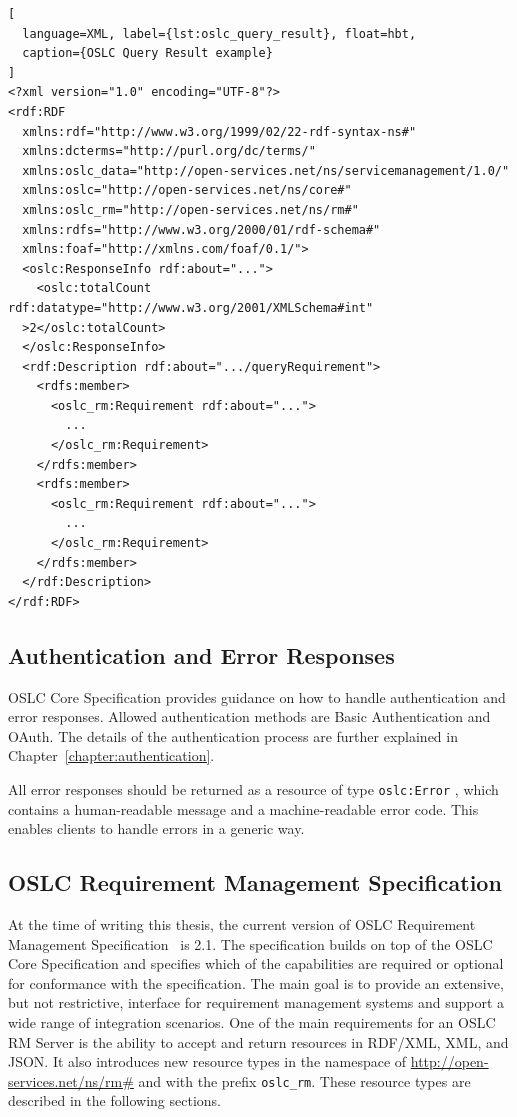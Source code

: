 \begin{lstlisting}[
  language=XML, label={lst:oslc_query_result}, float=hbt,
  caption={OSLC Query Result example}
]
<?xml version="1.0" encoding="UTF-8"?>
<rdf:RDF
  xmlns:rdf="http://www.w3.org/1999/02/22-rdf-syntax-ns#"
  xmlns:dcterms="http://purl.org/dc/terms/"
  xmlns:oslc_data="http://open-services.net/ns/servicemanagement/1.0/"
  xmlns:oslc="http://open-services.net/ns/core#"
  xmlns:oslc_rm="http://open-services.net/ns/rm#"
  xmlns:rdfs="http://www.w3.org/2000/01/rdf-schema#"
  xmlns:foaf="http://xmlns.com/foaf/0.1/">
  <oslc:ResponseInfo rdf:about="...">
    <oslc:totalCount rdf:datatype="http://www.w3.org/2001/XMLSchema#int"
  >2</oslc:totalCount>
  </oslc:ResponseInfo>
  <rdf:Description rdf:about=".../queryRequirement">
    <rdfs:member>
      <oslc_rm:Requirement rdf:about="...">
        ...
      </oslc_rm:Requirement>
    </rdfs:member>
    <rdfs:member>
      <oslc_rm:Requirement rdf:about="...">
        ...
      </oslc_rm:Requirement>
    </rdfs:member>
  </rdf:Description>
</rdf:RDF>
\end{lstlisting}

\subsection*{Authentication and Error Responses}
OSLC Core Specification provides guidance on how to handle authentication and error responses. Allowed authentication methods are Basic Authentication and OAuth. The details of the authentication process are further explained in Chapter \ref{chapter:authentication}.

All error responses should be returned as a resource of type \texttt{oslc:Error} \cite{oslc_core_error}, which contains a human-readable message and a machine-readable error code. This enables clients to handle errors in a generic way.

\subsection{OSLC Requirement Management Specification}
\label{sec:oslc_rm_specification}
At the time of writing this thesis, the current version of OSLC Requirement Management Specification \cite{oslc_requirement_management_specification} is 2.1. The specification builds on top of the OSLC Core Specification and specifies which of the capabilities are required or optional for conformance with the specification. The main goal is to provide an extensive, but not restrictive, interface for requirement management systems and support a wide range of integration scenarios. One of the main requirements for an OSLC RM Server is the ability to accept and return resources in RDF/XML, XML, and JSON. It also introduces new resource types in the namespace of \url{http://open-services.net/ns/rm\#} and with the prefix \texttt{oslc\_rm}. These resource types are described in the following sections.

